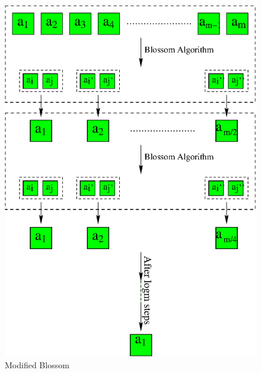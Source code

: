 \documentclass[10pt, conference]{IEEEtran}
\begin{document}
\begin{figure}[tb]
\centering 
\includegraphics[scale=0.5]{./figure/blossom.eps}
\vspace{0.0cm}\caption{Modified Blossom}
\vspace{-0.1cm}
\label{blossom}
\end{figure}

\end{document}
